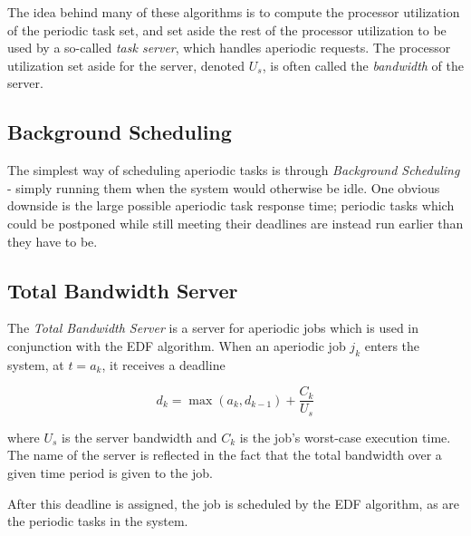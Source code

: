 \documentclass[twoside]{uva-inf-bachelor-thesis}
\begin{document}
The idea behind many of these algorithms is to compute the processor utilization of the periodic task set, and set aside the rest of the processor utilization to be used by a so-called \emph{task server}, which handles aperiodic requests. The processor utilization set aside for the server, denoted $U_s$, is often called the \emph{bandwidth} of the server.

\subsection{Background Scheduling}
The simplest way of scheduling aperiodic tasks is through \emph{Background Scheduling} - simply running them when the system would otherwise be idle. One obvious downside is the large possible aperiodic task response time; periodic tasks which could be postponed while still meeting their deadlines are instead run earlier than they have to be.

\subsection{Total Bandwidth Server}
The \emph{Total Bandwidth Server} is a server for aperiodic jobs which is used in conjunction with the EDF algorithm. When an aperiodic job $j_k$ enters the system, at $t = a_k$, it receives a deadline

\[ d_k = \max(a_k, d_{k-1}) + \frac{C_k}{U_s} \]

where $U_s$ is the server bandwidth and $C_k$ is the job's worst-case execution time. The name of the server is reflected in the fact that the total bandwidth over a given time period is given to the job.

After this deadline is assigned, the job is scheduled by the EDF algorithm, as are the periodic tasks in the system.
\end{document}

